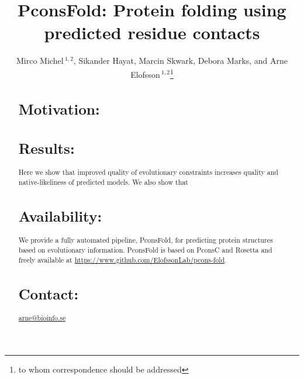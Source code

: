 \documentclass{bioinfo}
\begin{document}

\title[PconsFold]{PconsFold: Protein folding using predicted residue contacts}
\author[M.Michel \textit{et~al}]{Mirco Michel\,$^{1,2}$, Sikander Hayat, Marcin Skwark, Debora Marks, and Arne Elofsson\,$^{1,2}$\footnote{to whom correspondence should be addressed}}
\address{$^{1}$Department of Biochemistry and Biophysics, Stockholm University, 10691 Stockholm, Sweden\\
$^{2}$Science for Life Laboratory, Box 1031, 17121 Solna, Sweden\\
AFFILIATIONS}



\maketitle

\begin{abstract}

\section{Motivation:}

\section{Results:}
Here we show that improved quality of evolutionary constraints increases quality and native-likeliness of predicted models. We also show that 
\section{Availability:}
We provide a fully automated pipeline, PconsFold, for predicting protein structures based on evolutionary information. PconsFold is based on PconsC and Rosetta and freely available at \url{https://www.github.com/ElofssonLab/pcons-fold}.
\section{Contact:} \href{arne@bioinfo.se}{arne@bioinfo.se}
\end{abstract}
\end{document}
